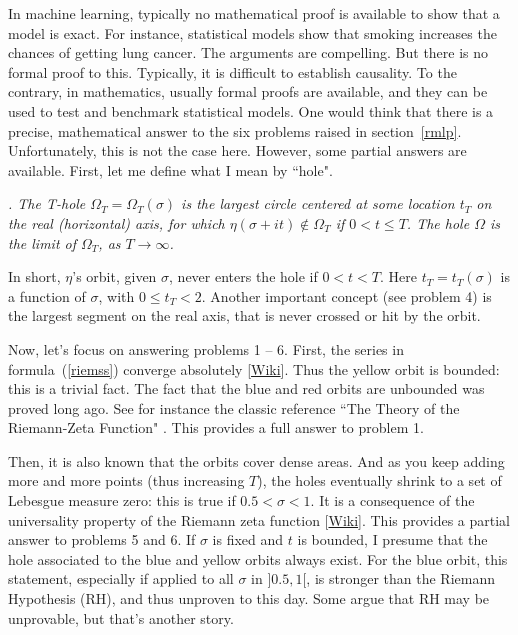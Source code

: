 \documentclass[oneside,10pt]{book}
\begin{document}
In machine learning, typically no mathematical proof is available to show that a model is exact. For instance, statistical models show that smoking increases the chances of getting lung cancer. The arguments are compelling. But there is no formal proof to this. Typically, it is difficult to establish causality. To the contrary, in mathematics, usually formal proofs are
available, and they can be used to test and benchmark statistical models. One would think that there is a precise, mathematical answer to the six problems raised in section~\ref{rmlp}. Unfortunately, this is not the case here. However, some partial answers are available. 
First, let me define what I mean by ``hole".


{\em {}.  The T-hole $\Omega_T
=\Omega_T(\sigma)$ is the largest circle centered at some location
$t_T$ on the real (horizontal) axis, for which $\eta(\sigma +it)\notin \Omega_T$ if $0< t\leq T$. The hole $\Omega$ is the limit of $\Omega_T$, as $T\rightarrow \infty$. 
}


\noindent In short, $\eta$'s orbit, given $\sigma$, never enters the hole if $0<t<T$. Here $t_T=t_T(\sigma)$ is a function of $\sigma$, with $0\leq t_T < 2$.
Another important concept (see problem 4) is the largest segment on the real axis, that is never crossed or hit by the orbit. 

Now, let's focus on answering problems 1 -- 6. First, the series in formula~(\ref{riemss})  converge absolutely [\href{https://en.wikipedia.org/wiki/Absolute_convergence}{Wiki}]. Thus the yellow orbit is bounded: this is a trivial fact.  The fact that the blue and red orbits are unbounded was proved long ago. See for instance the classic reference ``The Theory
 of the Riemann-Zeta Function"  \cite{tdr1987}. This provides a full answer to problem 1.

Then, it is also known that the orbits cover dense areas. And as you keep adding more and more points (thus increasing $T$), the holes eventually shrink to a set of Lebesgue measure zero: this is true if $0.5 < \sigma < 1$. It is a consequence of the universality property of the Riemann zeta function [\href{https://en.wikipedia.org/wiki/Zeta_function_universality}{Wiki}]. This provides a partial answer to problems 5 and 6.
If $\sigma$ is fixed and $t$ is bounded, I presume that the hole associated to the blue and yellow orbits always exist. For the blue orbit,
this statement, especially if applied to all $\sigma$ in $]0.5, 1[$,  is stronger than the Riemann Hypothesis (RH), and thus unproven to this day. Some argue that RH may be unprovable, but that's another story. 
\end{document}
